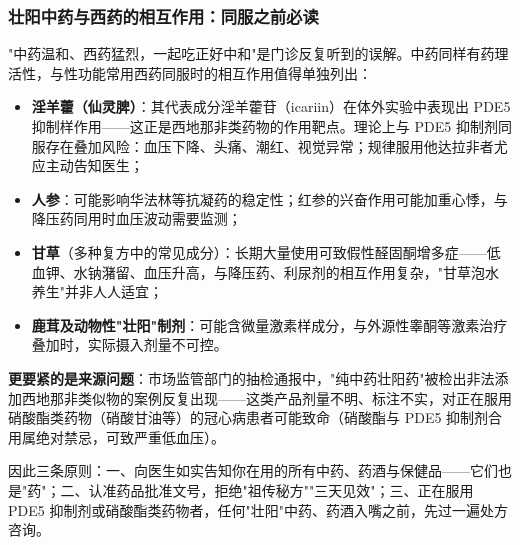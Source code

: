 \subsubsection{壮阳中药与西药的相互作用：同服之前必读}

"中药温和、西药猛烈，一起吃正好中和"是门诊反复听到的误解。中药同样有药理活性，与性功能常用西药同服时的相互作用值得单独列出：

\begin{itemize}
\item \textbf{淫羊藿（仙灵脾）}：其代表成分淫羊藿苷（icariin）在体外实验中表现出 PDE5 抑制样作用——这正是西地那非类药物的作用靶点。理论上与 PDE5 抑制剂同服存在叠加风险：血压下降、头痛、潮红、视觉异常；规律服用他达拉非者尤应主动告知医生；
\item \textbf{人参}：可能影响华法林等抗凝药的稳定性；红参的兴奋作用可能加重心悸，与降压药同用时血压波动需要监测；
\item \textbf{甘草}（多种复方中的常见成分）：长期大量使用可致假性醛固酮增多症——低血钾、水钠潴留、血压升高，与降压药、利尿剂的相互作用复杂，"甘草泡水养生"并非人人适宜；
\item \textbf{鹿茸及动物性"壮阳"制剂}：可能含微量激素样成分，与外源性睾酮等激素治疗叠加时，实际摄入剂量不可控。
\end{itemize}

\textbf{更要紧的是来源问题}：市场监管部门的抽检通报中，"纯中药壮阳药"被检出非法添加西地那非类似物的案例反复出现——这类产品剂量不明、标注不实，对正在服用硝酸酯类药物（硝酸甘油等）的冠心病患者可能致命（硝酸酯与 PDE5 抑制剂合用属绝对禁忌，可致严重低血压）。

因此三条原则：一、向医生如实告知你在用的所有中药、药酒与保健品——它们也是"药"；二、认准药品批准文号，拒绝"祖传秘方""三天见效"；三、正在服用 PDE5 抑制剂或硝酸酯类药物者，任何"壮阳"中药、药酒入嘴之前，先过一遍处方咨询。
